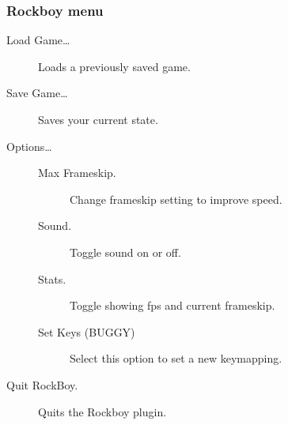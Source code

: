 \subsubsection{Rockboy menu}
\begin{description}
\item[Load Game\ldots] Loads a previously saved game.
\item[Save Game\ldots] Saves your current state.
\item[Options\ldots]
    \begin{description}
    \item[Max Frameskip.]
    Change frameskip setting to improve speed.
    \item[Sound.]
    Toggle sound on or off.
    \item[Stats.]
    Toggle showing fps and current frameskip.
    \item[Set Keys (BUGGY)]
    Select this option to set a new keymapping.
    \end{description}
\item[Quit RockBoy.] Quits the Rockboy plugin.
\end{description}
